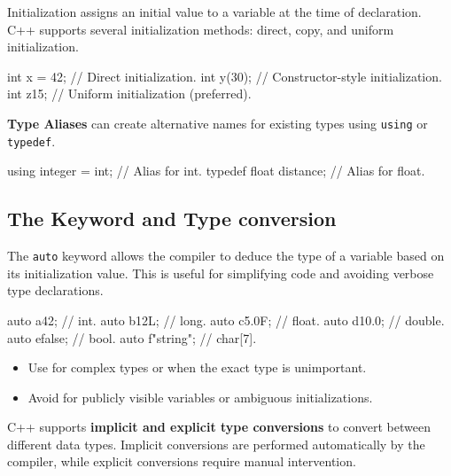 Initialization assigns an initial value to a variable at the time of declaration. C++ supports several initialization methods: direct, copy, and uniform initialization.

\begin{codeblock}[language=C++, numbers=none]
int x = 42;     // Direct initialization.
int y(30);      // Constructor-style initialization.
int z{15};      // Uniform initialization (preferred).
\end{codeblock}

\textbf{Type Aliases} can create alternative names for existing types using \texttt{using} or \texttt{typedef}.

\begin{codeblock}[language=C++, numbers=none]
using integer = int;    // Alias for int.
typedef float distance; // Alias for float.
\end{codeblock}

\subsection{The  Keyword and Type conversion}

\vspace{-0.5em}

The \texttt{auto} keyword allows the compiler to deduce the type of a variable based on its initialization value. This is useful for simplifying code and avoiding verbose type declarations.

\begin{codeblock}[language=C++, numbers=none]
auto a{42};         // int.
auto b{12L};        // long.
auto c{5.0F};       // float.
auto d{10.0};       // double.
auto e{false};      // bool.
auto f{"string"};   // char[7].
\end{codeblock}

\begin{tipsblock}
    \begin{itemize}
        \item Use  for complex types or when the exact type is unimportant.
        \item Avoid  for publicly visible variables or ambiguous initializations.
    \end{itemize}
\end{tipsblock}

C++ supports \textbf{implicit and explicit type conversions} to convert between different data types. Implicit conversions are performed automatically by the compiler, while explicit conversions require manual intervention.

